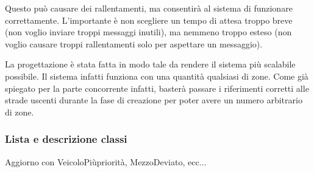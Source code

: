 \documentclass{article}
\begin{document}
Questo pu\`{o} causare dei rallentamenti, ma consentir\`{a} al sistema di funzionare correttamente. L\textquoteright{}importante \`{e} non scegliere un tempo di attesa troppo breve (non voglio inviare troppi messaggi inutili), ma nemmeno troppo esteso (non voglio causare troppi rallentamenti solo per aspettare un messaggio).
\par La progettazione \`{e} stata fatta in modo tale da rendere il sistema pi\`{u} scalabile possibile. Il sistema infatti funziona con una quantit\`{a} qualsiasi di zone. Come gi\`{a} spiegato per la parte concorrente infatti, baster\`{a} passare i riferimenti corretti alle strade uscenti durante la fase di creazione per poter avere un numero arbitrario di zone.

\subsubsection{Lista e descrizione classi}

Aggiorno con VeicoloPiùpriorità, MezzoDeviato, ecc...
\end{document}
